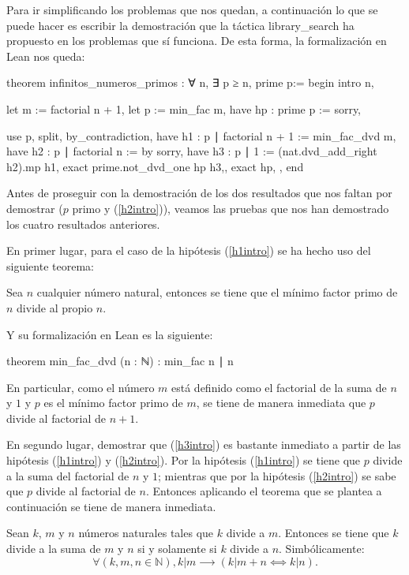 Para ir simplificando los problemas que nos quedan, a continuación lo
que se puede hacer es escribir la demostración que la táctica
 {library\_search} ha propuesto en los problemas
que sí funciona. De esta forma, la formalización en Lean nos queda:
\begin{leancode}
theorem infinitos_numeros_primos : ∀ n, ∃ p ≥ n, prime p:=
begin
  intro n,

  let m := factorial n + 1,
  let p := min_fac m,
  have hp : prime p := sorry,

  use p,
  split,
  { by_contradiction,
    have h1 : p ∣ factorial n + 1 := min_fac_dvd m,
    have h2 : p ∣ factorial n := by sorry,
    have h3 : p ∣ 1 := (nat.dvd_add_right h2).mp h1,
    exact prime.not_dvd_one hp h3,},
  { exact hp, },
end
\end{leancode}

Antes de proseguir con la demostración de los dos resultados que nos faltan
por demostrar (\(p\) primo y (\ref{h2intro})), veamos las pruebas que nos han
demostrado los cuatro resultados anteriores.

En primer lugar, para el caso de la hipótesis (\ref{h1intro}) se ha hecho uso
del siguiente teorema:
\begin{teorema}
  Sea \(n\) cualquier número natural, entonces se tiene que el mínimo factor
  primo de \(n\) divide al propio \(n\).
\end{teorema}
Y su formalización en Lean es la siguiente:
\begin{leancode}
theorem min_fac_dvd (n : ℕ) : min_fac n ∣ n
\end{leancode}

En particular, como el número \(m\) está definido como el factorial de la suma
de \(n\) y \(1\) y \(p\) es el mínimo factor primo de \(m\), se tiene de manera
inmediata que \(p\) divide al factorial de \(n+1\).

En segundo lugar, demostrar que (\ref{h3intro}) es bastante inmediato a partir
de las hipótesis (\ref{h1intro}) y (\ref{h2intro}). Por la hipótesis
(\ref{h1intro}) se tiene que \(p\) divide a la suma del factorial de \(n\) y
\(1\); mientras que por la hipótesis (\ref{h2intro}) se sabe que \(p\) divide
al factorial de \(n\). Entonces aplicando el teorema que se plantea a
continuación se tiene de manera inmediata.
\begin{teorema}
  Sean \(k\), \(m\) y \(n\) números naturales tales que \(k\) divide a
  \(m\). Entonces se tiene que \(k\) divide a la suma de \(m\) y \(n\)
  si y solamente si \(k\) divide a \(n\).  Simbólicamente:
  \begin{equation*}
    ∀(k,m,n∈ℕ), k|m ⟶ (k|m+n⟺k|n).
  \end{equation*}
\end{teorema}

